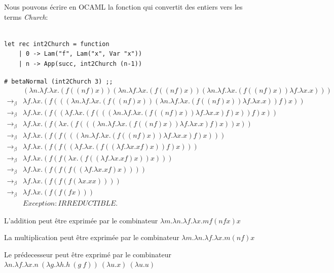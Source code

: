 \documentclass[11pt]{book}
\begin{document}
Nous pouvons écrire en OCAML la fonction qui convertit des entiers vers les terms \textit{Church}:
\begin{Verbatim}

let rec int2Church = function
	| 0 -> Lam("f", Lam("x", Var "x"))
	| n -> App(succ, int2Church (n-1))
\end{Verbatim}

\verb+# betaNormal (int2Church 3) ;;+
$$
\begin{array}{ll}
 & (\lambda n . \lambda f . \lambda x . (f((nf)x))(\lambda n . \lambda f . \lambda x . (f((nf)x))(\lambda n . \lambda f . \lambda x . (f((nf)x))\lambda f . \lambda x . x)))   \\
\rightarrow _\beta & \lambda f . \lambda x . (f(((\lambda n . \lambda f . \lambda x . (f((nf)x))(\lambda n . \lambda f . \lambda x . (f((nf)x))\lambda f . \lambda x . x))f)x))   \\
\rightarrow _\beta & \lambda f . \lambda x . (f((\lambda f . \lambda x . (f(((\lambda n . \lambda f . \lambda x . (f((nf)x))\lambda f . \lambda x . x)f)x))f)x))   \\
\rightarrow _\beta & \lambda f . \lambda x . (f(\lambda x . (f(((\lambda n . \lambda f . \lambda x . (f((nf)x))\lambda f . \lambda x . x)f)x))x))   \\
\rightarrow _\beta & \lambda f . \lambda x . (f(f(((\lambda n . \lambda f . \lambda x . (f((nf)x))\lambda f . \lambda x . x)f)x)))   \\
\rightarrow _\beta & \lambda f . \lambda x . (f(f((\lambda f . \lambda x . (f((\lambda f . \lambda x . xf)x))f)x)))   \\
\rightarrow _\beta & \lambda f . \lambda x . (f(f(\lambda x . (f((\lambda f . \lambda x . xf)x))x)))   \\
\rightarrow _\beta & \lambda f . \lambda x . (f(f(f((\lambda f . \lambda x . xf)x))))   \\
\rightarrow _\beta & \lambda f . \lambda x . (f(f(f(\lambda x . xx))))   \\
\rightarrow _\beta & \lambda f . \lambda x . (f(f(fx)))   \\
& Exception: IRREDUCTIBLE. 
\end{array}
$$

L'addition peut être  exprimée par le combinateur $\lambda m .\lambda n .\lambda f. \lambda x. m f (n f x) x$ 


La multiplication peut être exprimée par le combinateur $\lambda m .\lambda n .\lambda f. \lambda x. m (n f) x $ 


Le prédecesseur peut être exprimé par le combinateur $\lambda n.\lambda f.\lambda x.n\ (\lambda g.\lambda h.h\ (g\ f))\ (\lambda u.x)\ (\lambda u.u) $ 
\end{document}

